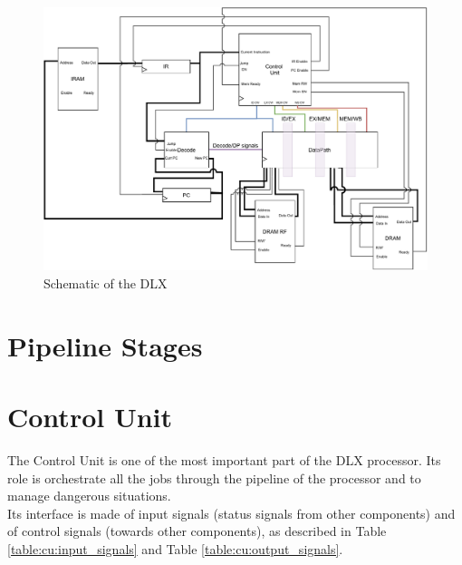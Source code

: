 \begin{figure}[ht]
    \centering
    \includegraphics[width=1\textwidth]{chapters/2_dlx/images/DLX.pdf}
    \caption{Schematic of the DLX}
    \label{DLX}
\end{figure} 

\newpage
\section{Pipeline Stages}

\section{Control Unit}

The Control Unit is one of the most important part of the DLX processor. Its role is orchestrate all the jobs through the pipeline of the processor and to manage dangerous situations.\\

Its interface is made of input signals (status signals from other components) and of control signals (towards other components), as described in Table \ref{table:cu:input_signals} and Table \ref{table:cu:output_signals}.

